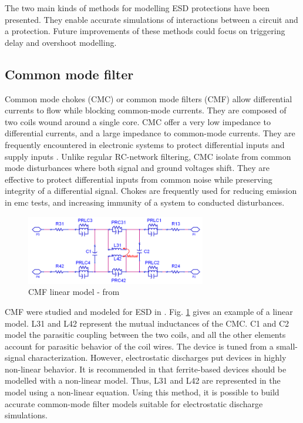 The two main kinds of methods for modelling ESD protections have been presented.
They enable accurate simulations of interactions between a circuit and a protection.
Future improvements of these methods could focus on triggering delay and overshoot modelling.

\subsection{Common mode filter}

Common mode chokes (CMC) or common mode filters (CMF) allow differential currents to flow while blocking common-mode currents.
They are composed of two coils wound around a single core.
CMC offer a very low impedance to differential currents, and a large impedance to common-mode currents.
They are frequently encountered in electronic systems to protect differential inputs and supply inputs \cite{cmc-for-emc-protection, cmc-esd, alternative-cmc-emi-noise}.
Unlike regular RC-network filtering, CMC isolate from common mode disturbances where both signal and ground voltages shift.
They are effective to protect differential inputs from common noise while preserving integrity of a differential signal.
Chokes are frequently used for reducing emission in \gls{emc} tests, and increasing immunity of a system to conducted disturbances.

\begin{figure}[!h]
  \centering
  \includegraphics[width=0.7\textwidth]{src/2/figures/cmc.png}
  \caption{CMF linear model - from \cite{usb2ESDProtection}}
  \label{fig:cmf-model}
\end{figure}

CMF were studied and modeled for ESD in \cite{usb2ESDProtection}.
Fig. \ref{fig:cmf-model} gives an example of a linear model.
L31 and L42 represent the mutual inductances of the CMC.
C1 and C2 model the parasitic coupling between the two coils, and all the other elements account for parasitic behavior of the coil wires.
The device is tuned from a small-signal characterization.
However, electrostatic discharges put devices in highly non-linear behavior.
It is recommended in \cite{esd-codesign} that ferrite-based devices should be modelled with a non-linear model.
Thus, L31 and L42 are represented in the model using a non-linear equation.
Using this method, it is possible to build accurate common-mode filter models suitable for electrostatic discharge simulations.

